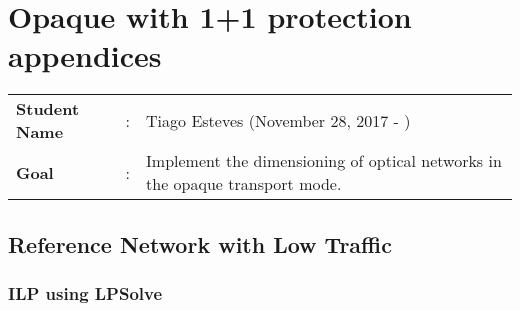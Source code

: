 \clearpage

\section{Opaque with 1+1 protection appendices}
\begin{tcolorbox}	
\begin{tabular}{p{2.75cm} p{0.2cm} p{10.5cm}} 	
\textbf{Student Name}  &:& Tiago Esteves    (November 28, 2017 - )\\
\textbf{Goal}          &:& Implement the dimensioning of optical networks in the opaque transport mode.
\end{tabular}
\end{tcolorbox}

\subsection{Reference Network with Low Traffic}

\subsubsection{ILP using LPSolve}

